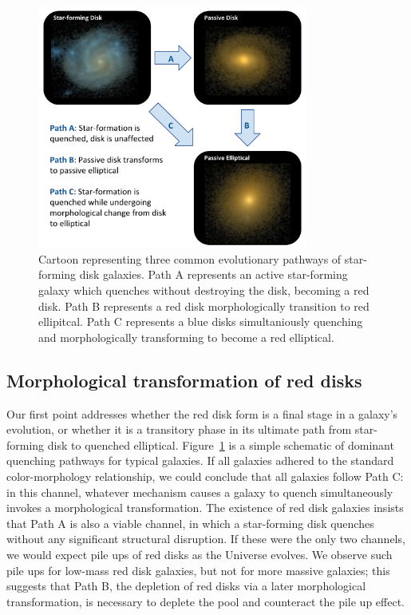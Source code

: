 \documentclass[useAMS,usenatbib]{mn2e}
\begin{document}
\begin{figure}
\centering
\includegraphics[width=3.5in]{figures/cartoon.pdf}
\caption{Cartoon representing three common evolutionary pathways of star-forming disk galaxies. Path A represents an active star-forming galaxy which quenches without destroying the disk, becoming a red disk. Path B represents a red disk morphologically transition to red ellipitcal. Path C represents a blue disks simultaniously quenching and morphologically transforming to become a red elliptical. }
\label{fig:cartoon}
\end{figure}

\subsection{Morphological transformation of red disks}

Our first point addresses whether the red disk form is a final stage in a galaxy's evolution, or whether it is a transitory phase in its ultimate path from star-forming disk to quenched elliptical. Figure~\ref{fig:cartoon} is a simple schematic of dominant quenching pathways for typical galaxies. If all galaxies adhered to the standard color-morphology relationship, we could conclude that all galaxies follow Path C: in this channel, whatever mechanism causes a galaxy to quench simultaneously invokes a morphological transformation. The existence of red disk galaxies insists that Path A is also a viable channel, in which a star-forming disk quenches without any significant structural disruption. If these were the only two channels, we would expect pile ups of red disks as the Universe evolves. We observe such pile ups for low-mass red disk galaxies, but not for more massive galaxies; this suggests that Path B, the depletion of red disks via a later morphological transformation, is necessary to deplete the pool and counteract the pile up effect.
\end{document}
